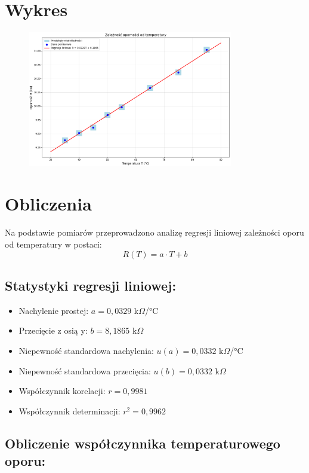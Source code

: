 \documentclass[11pt]{article}
\begin{document}
\section*{Wykres}
\begin{figure}[H]
\centering
\includegraphics[width=0.8\textwidth]{termOpor.png}
\label{fig:resistance_vs_temperature}
\end{figure}
\section*{Obliczenia}

Na podstawie pomiarów przeprowadzono analizę regresji liniowej zależności oporu od temperatury w postaci:
\begin{equation}
    R(T) = a \cdot T + b
\end{equation}

\subsection*{Statystyki regresji liniowej:}
\begin{itemize}
    \item Nachylenie prostej: $a = 0{,}0329$ k$\Omega$/°C
    \item Przecięcie z osią y: $b = 8{,}1865$ k$\Omega$
    \item Niepewność standardowa nachylenia: $u(a) = 0{,}0332$ k$\Omega$/°C
    \item Niepewność standardowa przecięcia: $u(b) = 0{,}0332$ k$\Omega$
    \item Współczynnik korelacji: $r = 0{,}9981$
    \item Współczynnik determinacji: $r^2 = 0{,}9962$
\end{itemize}

\subsection*{Obliczenie współczynnika temperaturowego oporu:}
\end{document}
